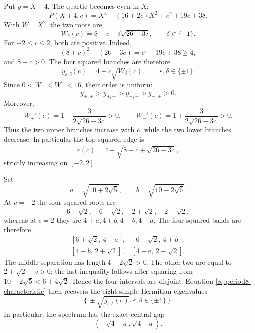 Put $y=X+4$.  The quartic becomes even in $X$:
\begin{equation}
 P(X+4,c)=X^4-(16+2c)X^2+c^2+19c+38.
 \label{eq:centered-quartic}
\end{equation}
With $W=X^2$, the two roots are
\begin{equation}
 W_\delta(c)=8+c+\delta\sqrt{26-3c},\qquad \delta\in\{\pm1\}.
 \label{eq:w-branches}
\end{equation}
For $-2\leq c\leq2$, both are positive.  Indeed,
\[
 (8+c)^2-(26-3c)=c^2+19c+38\geq4,
\]
and $8+c>0$.  The four squared branches are therefore
\begin{equation}
 y_{\varepsilon,\delta}(c)=4+\varepsilon\sqrt{W_\delta(c)},
 \qquad \varepsilon,\delta\in\{\pm1\}.
 \label{eq:four-squared-branches}
\end{equation}
Since $0<W_-<W_+<16$, their order is uniform:
\[
 y_{+,+}>y_{+,-}>y_{-,-}>y_{-,+}>0.
\]
Moreover,
\[
 W_+'(c)=1-\frac{3}{2\sqrt{26-3c}}>0,
 \qquad
 W_-'(c)=1+\frac{3}{2\sqrt{26-3c}}>0.
\]
Thus the two upper branches increase with $c$, while the two lower branches
decrease.  In particular the top squared edge is
\begin{equation}
 r(c)=4+\sqrt{8+c+\sqrt{26-3c}},
 \label{eq:top-dispersion}
\end{equation}
strictly increasing on $[-2,2]$.

Set
\[
 a=\sqrt{10+2\sqrt5},\qquad b=\sqrt{10-2\sqrt5}.
\]
At $c=-2$ the four squared roots are
\[
 6+\sqrt2,\quad6-\sqrt2,\quad2+\sqrt2,\quad2-\sqrt2,
\]
whereas at $c=2$ they are $4+a,4+b,4-b,4-a$.  The four squared bands are
therefore
\begin{equation}
\begin{array}{ll}
 [6+\sqrt2,\,4+a],&[6-\sqrt2,\,4+b],\\
 {}[4-b,\,2+\sqrt2],&[4-a,\,2-\sqrt2].
\end{array}
\label{eq:squared-bands}
\end{equation}
The middle separation has length $4-2\sqrt2>0$.  The other two are equal to
$2+\sqrt2-b>0$; the last inequality follows after squaring from
$10-2\sqrt5<6+4\sqrt2$.  Hence the four intervals are disjoint.  Equation
\eqref{eq:period8-characteristic} then recovers
the eight simple Hermitian eigenvalues
\[
 \{\,\pm\sqrt{y_{\varepsilon,\delta}(c)}:
       \varepsilon,\delta\in\{\pm1\}\,\}.
\]
In particular, the spectrum has the exact central gap
\begin{equation}
 \left(-\sqrt{4-a},\sqrt{4-a}\right).
 \label{eq:central-gap}
\end{equation}

